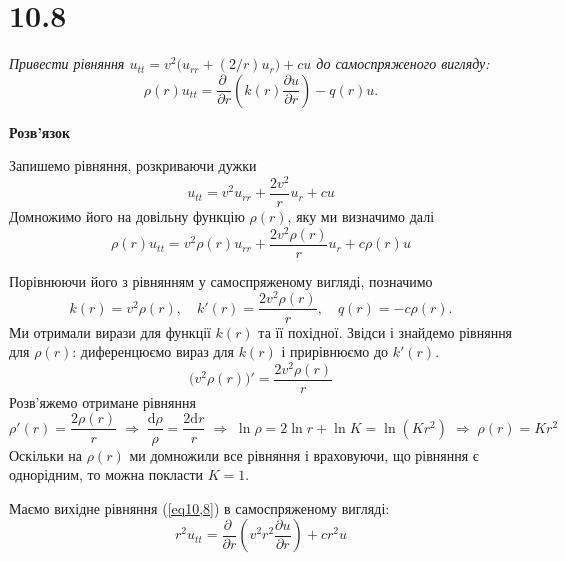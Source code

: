 %
%
%
%
%

\section[Задача №10.8]{10.8}

\textit{Привести рівняння $u_{tt} = v^2 \big(u_{rr} + (2/r) u_r\big) + cu$ до самоспряженого вигляду: \[\rho(r)u_{tt} = \frac{\partial\;}{\partial r} \left(k(r) \frac{\partial u}{\partial r}\right) - q(r)u.\]}

\begin{center}
    \large{\textbf{Розв'язок}}
\end{center}

Запишемо рівняння, розкриваючи дужки 
\begin{equation} \label{eq10,8}
    u_{tt} = v^2u_{rr} + \frac{2v^2}{r}u_r + cu
\end{equation}
Домножимо його на довільну функцію $\rho(r)$, яку ми визначимо далі
\begin{equation*}
    \rho(r)u_{tt} = v^2\rho(r)u_{rr} + \frac{2v^2\rho(r)}{r}u_r + c\rho(r)u
\end{equation*}

Порівнюючи його з рівнянням у самоспряженому вигляді, позначимо \[k(r) = v^2\rho(r),\quad k'(r) = \frac{2v^2\rho(r)}{r},\quad q(r) = - c\rho(r).\] Ми отримали вирази для функції $k(r)$ та її похідної. Звідси і знайдемо рівняння для $\rho(r)$: диференцюємо вираз для $k(r)$ і прирівнюємо до $k'(r)$.
\begin{equation}
    \big(v^2\rho(r)\big)' = \frac{2v^2\rho(r)}{r}
\end{equation}
Розв'яжемо отримане рівняння
\begin{equation*}
    \rho'(r) = \frac{2\rho(r)}{r}
    \;\Rightarrow\;
    \frac{\mathrm{d}\rho}{\rho} = \frac{2\mathrm{d}r}{r}
    \;\Rightarrow\;
    \ln\rho = 2\ln r + \ln K = \ln(Kr^2)
    \;\Rightarrow\;
    \rho(r) = Kr^2
\end{equation*}
Оскільки на $\rho(r)$ ми домножили все рівняння і враховуючи, що рівняння є однорідним, то можна покласти $K = 1$.

Маємо вихідне рівняння (\ref{eq10,8}) в самоспряженому вигляді:
\begin{equation}
    r^2u_{tt} = \frac{\partial\;}{\partial r} \left(v^2r^2 \frac{\partial u}{\partial r}\right) + cr^2u
\end{equation}

%